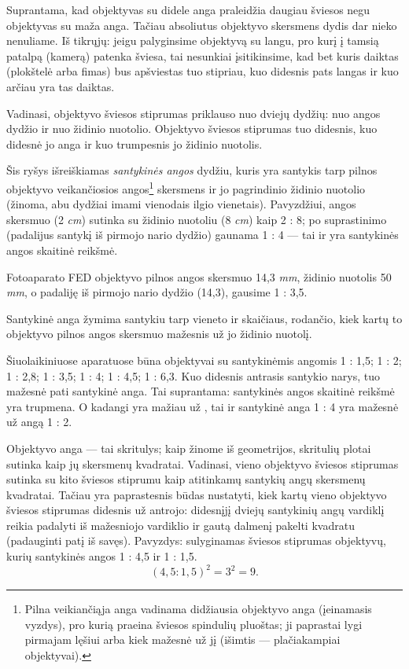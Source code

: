 \documentclass{book}
\begin{document}
					Suprantama, kad objektyvas su didele anga praleidžia daugiau šviesos negu objektyvas su maža anga. Tačiau absoliutus objektyvo skersmens dydis dar nieko nenuliame. Iš tikrųjų: jeigu palyginsime objektyvą su langu, pro kurį į tamsią patalpą (kamerą) patenka šviesa, tai nesunkiai įsitikinsime, kad bet kuris daiktas (plokštelė arba fimas) bus apšviestas tuo stipriau, kuo didesnis pats langas ir kuo arčiau yra tas daiktas.

					Vadinasi, objektyvo šviesos stiprumas priklauso nuo dviejų dydžių: nuo angos dydžio ir nuo židinio nuotolio. Objektyvo šviesos stiprumas tuo didesnis, kuo didesnė jo anga ir kuo trumpesnis jo židinio nuotolis.

					Šis ryšys išreiškiamas \textit{santykinės angos} dydžiu, kuris yra santykis tarp pilnos objektyvo veikančiosios angos\footnote{Pilna veikiančiąja anga vadinama didžiausia objektyvo anga (įeinamasis vyzdys), pro kurią praeina šviesos spindulių pluoštas; ji paprastai lygi pirmajam lęšiui arba kiek mažesnė už jį (išimtis --- plačiakampiai objektyvai).} skersmens ir jo pagrindinio židinio nuotolio (žinoma, abu dydžiai imami vienodais ilgio vienetais). Pavyzdžiui, angos skersmuo (2 \textit{cm}) sutinka su židinio nuotoliu (8 \textit{cm}) kaip 2 : 8; po suprastinimo (padalijus santykį iš pirmojo nario dydžio) gaunama 1 : 4 --- tai ir yra santykinės angos skaitinė reikšmė.

					Fotoaparato FED objektyvo pilnos angos skersmuo 14,3 \textit{mm}, židinio nuotolis 50 \textit{mm}, o padaliję iš pirmojo nario dydžio (14,3), gausime 1 : 3,5.

					Santykinė anga žymima santykiu tarp vieneto ir skaičiaus, rodančio, kiek kartų to objektyvo pilnos angos skersmuo mažesnis už jo židinio nuotolį.

					Šiuolaikiniuose aparatuose būna objektyvai su santykinėmis angomis 1 : 1,5; 1 : 2; 1 : 2,8; 1 : 3,5; 1 : 4; 1 : 4,5; 1 : 6,3. Kuo didesnis antrasis santykio narys, tuo mažesnė pati santykinė anga. Tai suprantama: santykinės angos skaitinė reikšmė yra trupmena. O kadangi  yra mažiau už , tai ir santykinė anga 1 : 4 yra mažesnė už angą 1 : 2.

					Objektyvo anga --- tai skritulys; kaip žinome iš geometrijos, skritulių plotai sutinka kaip jų skersmenų kvadratai. Vadinasi, vieno objektyvo šviesos stiprumas sutinka su kito šviesos stiprumu kaip atitinkamų santykių angų skersmenų kvadratai. Tačiau yra paprastesnis būdas nustatyti, kiek kartų vieno objektyvo šviesos stiprumas didesnis už antrojo: didesnįjį dviejų santykinių angų vardiklį reikia padalyti iš mažesniojo vardiklio ir gautą dalmenį pakelti kvadratu (padauginti patį iš savęs). Pavyzdys: sulyginamas šviesos stiprumas objektyvų, kurių santykinės angos 1 : 4,5 ir 1 : 1,5.
					\[
						(4,5 : 1,5)^{2} = 3^{2} = 9.
					\]
\end{document}
